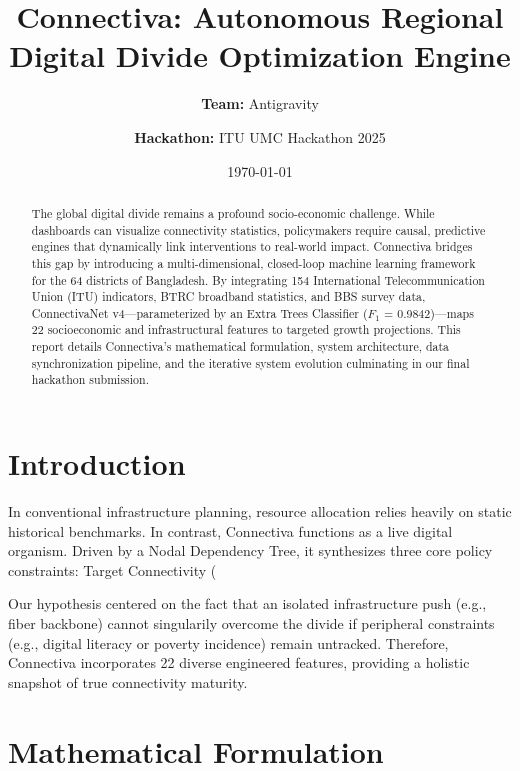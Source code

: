 \documentclass[11pt,a4paper]{article}
\title{\textbf{Connectiva: Autonomous Regional Digital Divide Optimization Engine}}
\author{\textbf{Team:} Antigravity \and \textbf{Hackathon:} ITU UMC Hackathon 2025}
\date{\today}
\begin{document}
\maketitle

\begin{abstract}
The global digital divide remains a profound socio-economic challenge. While dashboards can visualize connectivity statistics, policymakers require causal, predictive engines that dynamically link interventions to real-world impact. Connectiva bridges this gap by introducing a multi-dimensional, closed-loop machine learning framework for the 64 districts of Bangladesh. By integrating 154 International Telecommunication Union (ITU) indicators, BTRC broadband statistics, and BBS survey data, ConnectivaNet v4—parameterized by an Extra Trees Classifier ($F_1$ = 0.9842)—maps 22 socioeconomic and infrastructural features to targeted growth projections. This report details Connectiva's mathematical formulation, system architecture, data synchronization pipeline, and the iterative system evolution culminating in our final hackathon submission.
\end{abstract}

\section{Introduction}

In conventional infrastructure planning, resource allocation relies heavily on static historical benchmarks. In contrast, Connectiva functions as a live digital organism. Driven by a Nodal Dependency Tree, it synthesizes three core policy constraints: Target Connectivity (%

Our hypothesis centered on the fact that an isolated infrastructure push (e.g., fiber backbone) cannot singularily overcome the divide if peripheral constraints (e.g., digital literacy or poverty incidence) remain untracked. Therefore, Connectiva incorporates 22 diverse engineered features, providing a holistic snapshot of true connectivity maturity.

\section{Mathematical Formulation}
\end{document}
